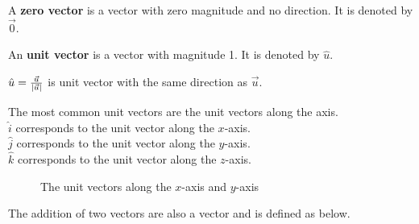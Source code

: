 \documentclass{huhtakm-template-book}
\begin{document}
\begin{defn}
    A \textbf{zero vector} is a vector with zero magnitude and no direction. It is denoted by $\vec{0}$.
\end{defn}
\begin{defn}
    An \textbf{unit vector} is a vector with magnitude 1. It is denoted by $\hat{u}$.
\end{defn}
\begin{lem}
    $\hat{u}=\frac{\vec{u}}{\left|{\vec{u}}\right|}$ is unit vector with the same direction as $\vec{u}$.
\end{lem}
\begin{eg}
    The most common unit vectors are the unit vectors along the axis.\\
    $\hat{i}$ corresponds to the unit vector along the $x$-axis.\\
    $\hat{j}$ corresponds to the unit vector along the $y$-axis.\\
    $\hat{k}$ corresponds to the unit vector along the $z$-axis.
\end{eg}
\begin{figure}[h]
    \centering
    \caption{The unit vectors along the $x$-axis and $y$-axis}
    \label{fig:unit vector}
\end{figure}
\begin{defn}
    The addition of two vectors are also a vector and is defined as below.
\end{defn}
\end{document}
